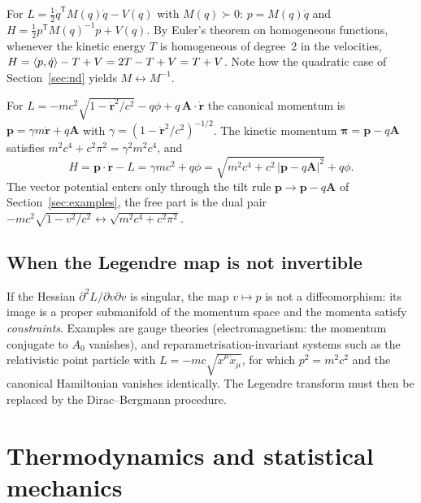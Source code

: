 \begin{example}
For $L=\tfrac12\dot q^{\mathsf T}M(q)\dot q-V(q)$ with $M(q)\succ0$:
$p=M(q)\dot q$ and $H=\tfrac12p^{\mathsf T}M(q)^{-1}p+V(q)$.  By Euler's theorem
on homogeneous functions, whenever the kinetic energy $T$ is homogeneous of
degree~2 in the velocities, $H=\langle p,\dot q\rangle-T+V=2T-T+V=T+V$.  Note how the
quadratic case of Section~\ref{sec:nd} yields $M\leftrightarrow M^{-1}$.
\end{example}

\begin{example}
For $L=-mc^2\sqrt{1-\dot{\mathbf r}^2/c^2}-q\phi+q\,\mathbf A\cdot\dot{\mathbf r}$
the canonical momentum is $\mathbf p=\gamma m\dot{\mathbf r}+q\mathbf A$ with
$\gamma=(1-\dot{\mathbf r}^2/c^2)^{-1/2}$.  The kinetic momentum
$\boldsymbol\pi=\mathbf p-q\mathbf A$ satisfies
$m^2c^4+c^2\pi^2=\gamma^2m^2c^4$, and
\[
  H=\mathbf p\cdot\dot{\mathbf r}-L=\gamma mc^2+q\phi
   =\sqrt{m^2c^4+c^2\,|\mathbf p-q\mathbf A|^2}+q\phi .
\]
The vector potential enters only through the tilt rule $\mathbf p\to\mathbf p-q\mathbf A$
of Section~\ref{sec:examples}, the free part is the dual pair
$-mc^2\sqrt{1-v^2/c^2}\leftrightarrow\sqrt{m^2c^4+c^2\pi^2}$.
\end{example}

\subsection{When the Legendre map is not invertible}

If the Hessian $\partial^2L/\partial v\partial v$ is singular, the map
$v\mapsto p$ is not a diffeomorphism: its image is a proper submanifold of
the momentum space and the momenta satisfy \emph{constraints}.  Examples are
gauge theories (electromagnetism: the momentum conjugate to $A_0$ vanishes),
and reparametrisation-invariant systems such as the relativistic point
particle with $L=-mc\sqrt{\dot x^\mu\dot x_\mu}$, for which $p^2=m^2c^2$ and
the canonical Hamiltonian vanishes identically.  The Legendre transform must
then be replaced by the Dirac--Bergmann procedure.

\section{Thermodynamics and statistical mechanics}\label{sec:thermo}

